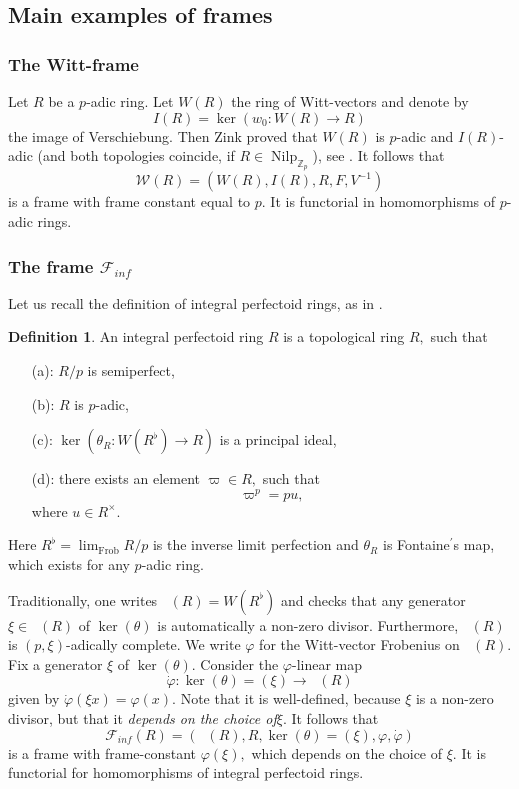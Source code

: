 \documentclass[a4paper,10,5 pt]{amsart}
\theoremstyle{definition}
\newtheorem{Definition}{Definition}
\DeclareMathOperator{\Nilp}{Nilp}
\DeclareMathOperator{\Ainf}{\mathbb{A}_{inf}}
\begin{document}
\subsection{Main examples of frames}
\subsubsection{The Witt-frame}
Let $R$ be a $p$-adic ring. Let $W(R)$ the ring of Witt-vectors and denote by $$I(R)=\ker(w_{0}\colon W(R)\rightarrow R)$$ the image of Verschiebung. Then Zink proved that $W(R)$ is $p$-adic and $I(R)$-adic (and both topologies coincide, if $R\in \Nilp_{\mathbb{Z}_{p}}$), see \cite[Prop. 3]{zink-displays}.  It follows that
$$\mathcal{W}(R)=(W(R),I(R),R,F,V^{-1})$$
is a frame with frame constant equal to $p$. It is functorial in homomorphisms of $p$-adic rings.

\subsubsection{The frame $\mathcal{F}_{inf}$}
Let us recall the definition of integral perfectoid rings, as in \cite{BMS1}.
\begin{Definition}
An integral perfectoid ring $R$ is a topological ring $R,$ such that
\begin{enumerate}
\item[(a):] $R/p$ is semiperfect,
\item[(b):] $R$ is $p$-adic,
\item[(c):] $\ker(\theta_{R}\colon W(R^{\flat})\rightarrow R)$ is a principal ideal,
\item[(d):] there exists an element $\varpi\in R,$ such that
$$
\varpi^{p}=pu,
$$
where $u\in R^{\times}.$
\end{enumerate}
Here $R^{\flat}=\lim_{\text{Frob}}R/p$ is the inverse limit perfection and $\theta_{R}$ is Fontaine$^{\prime}$s map, which exists for any $p$-adic ring.
\end{Definition}
Traditionally, one writes $\Ainf(R)=W(R^{\flat})$ and checks that any generator $\xi\in\Ainf(R)$ of $\ker(\theta)$ is automatically a non-zero divisor. Furthermore, $\Ainf(R)$ is $(p,\xi)$-adically complete. We write $\varphi$ for the Witt-vector Frobenius on $\Ainf(R).$
\\
Fix a generator $\xi$ of $\ker(\theta).$ Consider the $\varphi$-linear map
$$
\dot{\varphi}\colon \ker(\theta)=(\xi)\rightarrow \Ainf(R)
$$
given by $\dot{\varphi}(\xi x)=\varphi(x).$ Note that it is well-defined, because $\xi$ is a non-zero divisor, but that it \textit{depends on the choice of}$\xi$.
It follows that
$$
\mathcal{F}_{inf}(R)=(\Ainf(R),R,\ker(\theta)=(\xi),\varphi,\dot{\varphi})
$$
is a frame with frame-constant $\varphi(\xi),$ which depends on the choice of $\xi.$ It is functorial for homomorphisms of integral perfectoid rings.
\end{document}
